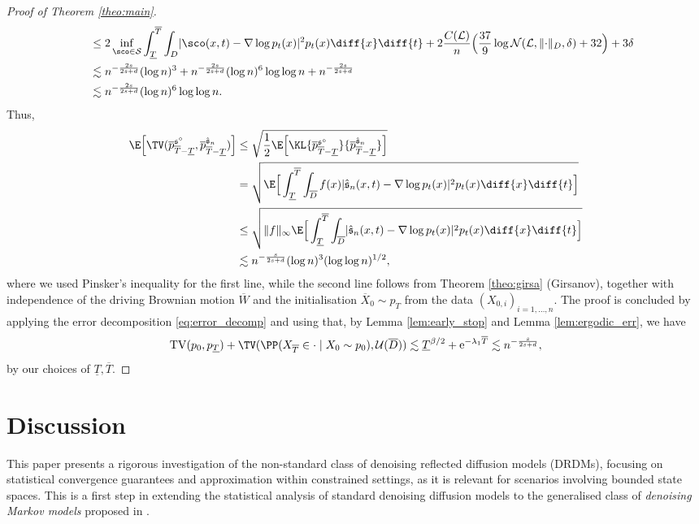 \documentclass[a4paper, 11pt, headings = small, abstract]{scrartcl}
\begin{document}
\begin{proof}[Proof of Theorem \ref{theo:main}]
\begin{align*}
&\quad \leq 2 \inf_{\sco \in \mathcal{S}} \int_{\underline{T}}^{\overline{T}} \int_{D} \lvert \sco(x,t) - \nabla \log p_t(x) \rvert^2 p_t(x) \diff{x} \diff{t} + 2\frac{C(\mathcal{L})}{n}\Big(\frac{37}{9}\log \mathcal{N}(\mathcal{L}, \lVert \cdot \rVert_{D}, \delta) + 32\Big) + 3\delta\\
&\quad\lesssim n^{-\frac{2s}{2s+d}}(\log n)^3 + n^{-\frac{2s}{2s+d}} (\log n)^6 \log \log n +  n^{-\frac{2s}{2s+d}}\\
&\quad\lesssim n^{-\frac{2s}{2s+d}} (\log n)^6 \log \log n.
\end{align*}
Thus, 
\begin{align*}
\E\Big[\TV(\overline{p}{}^{\mathfrak{s}^\circ}_{\overline{T} - \underline{T}}, \overline{p}{}^{\hat{\mathfrak{s}}_n}_{\overline{T} - \underline{T}}) \Big] &\leq \sqrt{\frac{1}{2}\E\Big[\KL{\overline{p}{}^{\mathfrak{s}^\circ}_{\overline{T} - \underline{T}}}{\overline{p}{}^{\hat{\mathfrak{s}}_n}_{\overline{T} - \underline{T}}} \Big]}\\
&= \sqrt{\E\Big[\int_{\underline{T}}^{\overline{T}} \int_{\overline{D}} f(x)\lvert \hat{\mathfrak{s}}_n(x,t) - \nabla \log p_t(x) \rvert^2 p_t(x) \diff{x} \diff{t}  \Big] }\\ 
&\leq \sqrt{\lVert f \rVert_\infty\E\Big[\int_{\underline{T}}^{\overline{T}} \int_{\overline{D}}\lvert \hat{\mathfrak{s}}_n(x,t) - \nabla \log p_t(x) \rvert^2 p_t(x) \diff{x} \diff{t}  \Big] }\\
&\lesssim n^{-\frac{s}{2s+d}}(\log n)^3 (\log \log n)^{1/2},
\end{align*}
where we used Pinsker's inequality for the first line, while the second line follows from Theorem \ref{theo:girsa} (Girsanov), together with independence of the driving Brownian motion $\overline{W}$ and the initialisation $\overline{X}_0 \sim p_T$ from the data $(X_{0,i})_{i= 1,\ldots,n}$. 
The proof is concluded by applying the error decomposition \eqref{eq:error_decomp} and using that, by Lemma \ref{lem:early_stop} and Lemma \ref{lem:ergodic_err}, we have
\[\mathrm{TV}(p_0,p_{\underline{T}}) + \TV(\PP(X_{\overline{T}} \in \cdot \mid X_0 \sim p_0), \mathcal{U}(\overline{D})) \lesssim \underline{T}^{\beta/2} + \mathrm{e}^{-\lambda_1 \overline{T}} \lesssim n^{-\frac{s}{2s+d}},\]
by our choices of $\underline{T},\overline{T}$.
\end{proof}


\section{Discussion}\label{sec:discussion}
This paper presents a rigorous investigation of the non-standard class of denoising reflected diffusion models (DRDMs), focusing on statistical convergence guarantees and approximation within constrained settings, as it is relevant for scenarios involving bounded state spaces. This is a first step in extending the statistical analysis of standard denoising diffusion models to the generalised class of \textit{denoising Markov models}  proposed in \cite{benton_shi24}.
\end{document}
